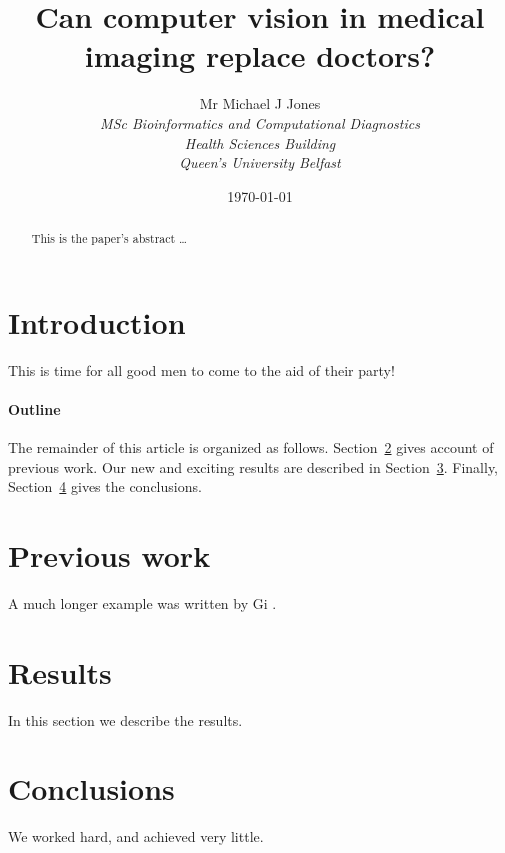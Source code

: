 \documentclass[12pt]{article}
\title{Can computer vision in medical imaging replace doctors?} %
\author{
        Mr Michael J Jones \\
                \em{MSc Bioinformatics and Computational Diagnostics}\\
       	Health Sciences Building\\
        Queen's University Belfast
}
\date{\today}
\begin{document}
\maketitle

\begin{abstract}
This is the paper's abstract \ldots
\end{abstract}

\section{Introduction}
This is time for all good men to come to the aid of their party!

\paragraph{Outline}
The remainder of this article is organized as follows.
Section~\ref{previous work} gives account of previous work.
Our new and exciting results are described in Section~\ref{results}.
Finally, Section~\ref{conclusions} gives the conclusions.

\section{Previous work}\label{previous work}
A much longer \LaTeXe{} example was written by Gi \textcite{hamilton2014digital}.

\section{Results}\label{results}
In this section we describe the results.

\section{Conclusions}\label{conclusions}
We worked hard, and achieved very little.

\printbibliography
\end{document}
